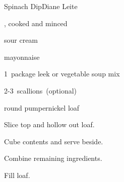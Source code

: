 \begin{recipe}{Spinach Dip}{Diane Leite}{}

\begin{ingredients}
\item {} , cooked and minced
\item {} sour cream
\item {} mayonnaise
\item 1~package leek or vegetable soup mix
\item 2-3~scallions~(optional)
\item round pumpernickel loaf
\end{ingredients}

\begin{directions}
\item Slice top and hollow out loaf.
\item Cube contents and serve beside.
\item Combine remaining ingredients.
\item Fill loaf.
\end{directions}

\end{recipe}
